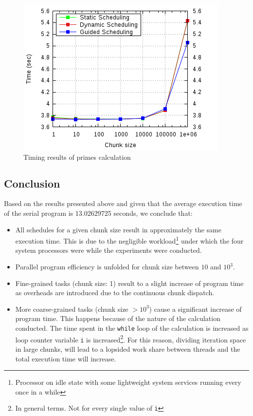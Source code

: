 \documentclass{article}
\def\code#1{\texttt{#1}}
\begin{document}
\begin{figure}[htbp]
  \centering
  \includegraphics[width=0.55\columnwidth]{../../hw2/ex2/plots/primes.png}
  \caption{Timing results of primes calculation}
\end{figure}


\subsection{Conclusion}
Based on the results presented above and given that the average execution time of the serial
program is 13.02629725 seconds, we conclude that:

\begin{itemize}
  \item All schedules for a given chunk size result in approximately the same execution time.
        This is due to the negligible workload\footnote{Processor on idle state with some lightweight
        system services running every once in a while} under which the four system processors were
        while the experiments were conducted.
  \item Parallel program efficiency is unfolded for chunk size between $10$ and $10^3$.
  \item Fine-grained tasks (chunk size: 1) result to a slight increase of program time as overheads
        are introduced due to the continuous chunk dispatch.
  \item More coarse-grained tasks (chunk size $> 10^3$) cause a significant increase of program time.
        This happens because of the nature of the calculation conducted. The time spent in the 
        \code{while} loop of the calculation is increased as loop counter variable \code{i} is 
        increased\footnote{In general terms. Not for every single value of \code{i}}. For this
        reason, dividing iteration space in large chunks, will lead to a lopsided work share
        between threads and the total execution time will increase.
\end{itemize}
\end{document}
